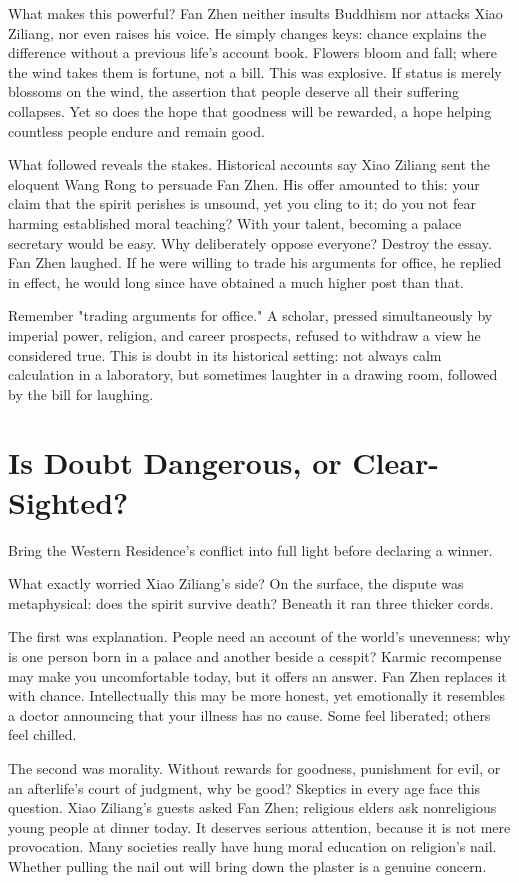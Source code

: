 What makes this powerful? Fan Zhen neither insults Buddhism nor attacks Xiao Ziliang, nor even raises his voice. He simply changes keys: chance explains the difference without a previous life's account book. Flowers bloom and fall; where the wind takes them is fortune, not a bill. This was explosive. If status is merely blossoms on the wind, the assertion that people deserve all their suffering collapses. Yet so does the hope that goodness will be rewarded, a hope helping countless people endure and remain good.

What followed reveals the stakes. Historical accounts say Xiao Ziliang sent the eloquent Wang Rong to persuade Fan Zhen. His offer amounted to this: your claim that the spirit perishes is unsound, yet you cling to it; do you not fear harming established moral teaching? With your talent, becoming a palace secretary would be easy. Why deliberately oppose everyone? Destroy the essay. Fan Zhen laughed. If he were willing to trade his arguments for office, he replied in effect, he would long since have obtained a much higher post than that.

Remember "trading arguments for office." A scholar, pressed simultaneously by imperial power, religion, and career prospects, refused to withdraw a view he considered true. This is doubt in its historical setting: not always calm calculation in a laboratory, but sometimes laughter in a drawing room, followed by the bill for laughing.

\section{Is Doubt Dangerous, or Clear-Sighted?}
Bring the Western Residence's conflict into full light before declaring a winner.

What exactly worried Xiao Ziliang's side? On the surface, the dispute was metaphysical: does the spirit survive death? Beneath it ran three thicker cords.

The first was explanation. People need an account of the world's unevenness: why is one person born in a palace and another beside a cesspit? Karmic recompense may make you uncomfortable today, but it offers an answer. Fan Zhen replaces it with chance. Intellectually this may be more honest, yet emotionally it resembles a doctor announcing that your illness has no cause. Some feel liberated; others feel chilled.

The second was morality. Without rewards for goodness, punishment for evil, or an afterlife's court of judgment, why be good? Skeptics in every age face this question. Xiao Ziliang's guests asked Fan Zhen; religious elders ask nonreligious young people at dinner today. It deserves serious attention, because it is not mere provocation. Many societies really have hung moral education on religion's nail. Whether pulling the nail out will bring down the plaster is a genuine concern.

